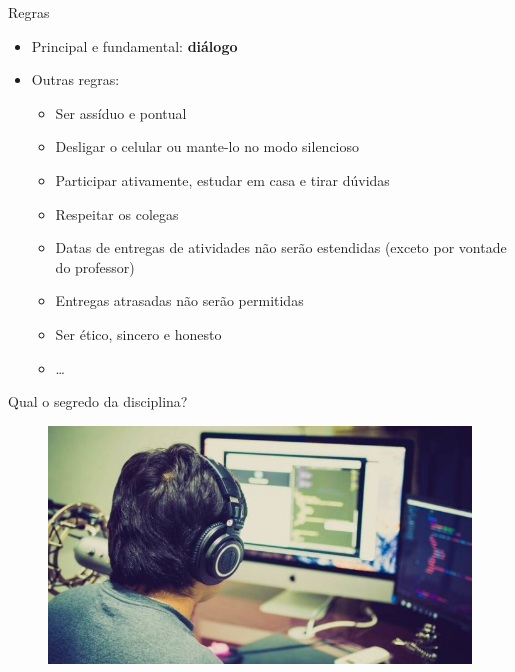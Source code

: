 \documentclass{beamer}
\begin{document}
\begin{frame}{Regras}
    \begin{itemize}
        \item Principal e fundamental: \textbf{diálogo}
        \item Outras regras:
        \begin{itemize}
            \item Ser assíduo e pontual
            \item Desligar o celular ou mante-lo no modo silencioso
            \item Participar ativamente, estudar em casa e tirar dúvidas
            \item Respeitar os colegas
            \item Datas de entregas de atividades não serão estendidas (exceto por vontade do professor)
            \item Entregas atrasadas não serão permitidas
            \item Ser ético, sincero e honesto
            \item \dots
        \end{itemize}
    \end{itemize}
\end{frame}

\begin{frame}{Qual o segredo da disciplina?}
    \begin{figure}
        \includegraphics[scale=0.4]{Theme/Logos/praticar.jpeg}
    \end{figure}
\end{frame}
\end{document}
